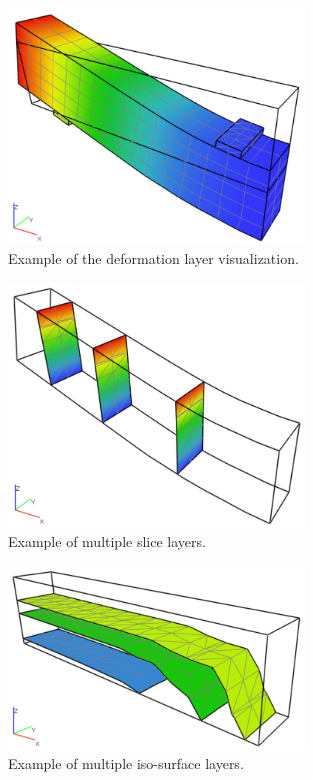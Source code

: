 \begin{figure}[H]
    \centering
    \includegraphics[width=0.7\textwidth]{figures/chapter-data-management/beam-deformation-layer}
    \decoRule
    \caption{Example of the deformation layer visualization.}
    \label{fig:beam-deformation-layer}
\end{figure}

\begin{figure}[H]
    \centering
    \includegraphics[width=0.7\textwidth]{figures/chapter-data-management/beam-slice-layers}
    \decoRule
    \caption{Example of multiple slice layers.}
    \label{fig:beam-slice-layers}
\end{figure}

\begin{figure}[H]
    \centering
    \includegraphics[width=0.7\textwidth]{figures/chapter-data-management/beam-isosurface-layers}
    \decoRule
    \caption{Example of multiple iso-surface layers.}
    \label{fig:beam-isosurface-layers}
\end{figure}


